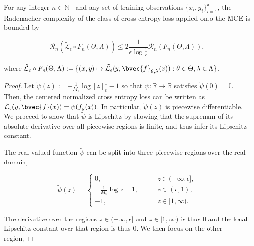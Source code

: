 \documentclass{llncs}
\numberwithin{equation}{section}
\numberwithin{table}{section}
\numberwithin{algorithm}{section}
\begin{document}
	\begin{lemma}
		\label{thm:rademacher_complexity_bound_with_cross_entropy_loss}
		
		For any integer $n \in \mathbb{N}_{+}$ and any set of training observations $\{x_{i}, y_{i}\}_{i = 1}^{n}$, the Rademacher complexity of the class of cross entropy loss applied onto the \gls{MCE} is bounded by
		
		\begin{equation}
		\mathcal{R}_{n}(\tilde{\mathcal{L}}_{\epsilon} \circ F_{n}(\Theta, \Lambda)) \leq 2 \frac{1}{\epsilon \log{\frac{1}{\epsilon}}} \mathcal{R}_{n}(F_{n}(\Theta, \Lambda)),
		\label{eq:composed_rademacher_complexity_bound}
		\end{equation}
		
		where $\tilde{\mathcal{L}}_{\epsilon} \circ F_{n}(\Theta, \Lambda) := \{(x, y) \mapsto \tilde{\mathcal{L}}_{\epsilon}(y, \bvec{f}_{\theta, \lambda}(x)) : \theta \in \Theta, \lambda \in \Lambda\}$.
		
		\begin{proof}
			Let $\tilde{\psi}(z) := - \frac{1}{M_{\epsilon}} \log{[z]_{\epsilon}^{1}} - 1$ so that $\tilde{\psi} : \mathbb{R} \to \mathbb{R}$ satisfies $\tilde{\psi}(0) = 0$. Then, the centered normalized cross entropy loss can be written as $\tilde{\mathcal{L}}_{\epsilon}(y, \bvec{f}(x)) = \tilde{\psi}(f_{y}(x))$. In particular, $\tilde{\psi}(z)$ is piecewise differentiable. We proceed to show that $\tilde{\psi}$ is Lipschitz by showing that the suprenum of its absolute derivative over all piecewise regions is finite, and thus infer its Lipschitz constant.
			
			The real-valued function $\tilde{\psi}$ can be split into three piecewise regions over the real domain,
			
			\begin{equation}
			\tilde{\psi}(z) = \begin{cases}
			0, \qquad &z \in (-\infty, \epsilon], \\
			- \frac{1}{M_{\epsilon}}\log{z} - 1, \qquad & z \in (\epsilon, 1), \\
			-1, & z \in [1, \infty).
			\end{cases}
			\end{equation}
			
			The derivative over the regions $z \in (-\infty, \epsilon]$ and $z \in [1, \infty)$ is thus $0$ and the local Lipschitz constant over that region is thus $0$. We then focus on the other region,
			

\end{proof}
\end{lemma}
\end{document}
